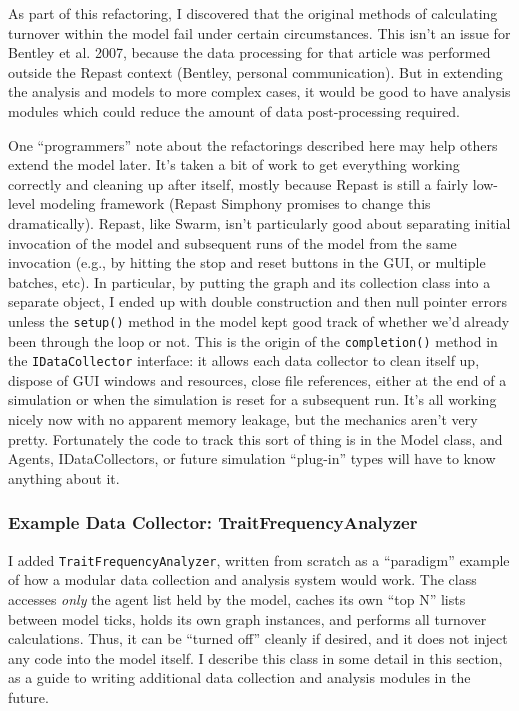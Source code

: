 \documentclass{kluwer-mem-copyright}
\begin{document}
\begin{article}
As part of this refactoring, I discovered that the original methods of
calculating turnover within the model fail under certain circumstances.  This
isn't an issue for Bentley et al. 2007, because the data processing for that
article was performed outside the Repast context (Bentley, personal
communication).  But in extending the analysis and models to more complex cases,
it would be good to have analysis modules which could reduce the amount of data
post-processing required.  

One ``programmers'' note about the refactorings described here may help others
extend the model later. It's taken a bit of work to
get everything working correctly and cleaning up after itself, mostly because
Repast is still a fairly low-level modeling framework (Repast Simphony promises
to change this dramatically). Repast, like
Swarm, isn't particularly good about separating initial invocation of the model
and subsequent runs of the model from the same invocation (e.g., by hitting the
stop and reset buttons in the GUI, or multiple batches, etc).  In particular, by
putting the graph and its collection class into a separate object, I ended up
with double construction and then null pointer errors unless the
\texttt{setup()} method in the model kept good track of whether we'd already
been through the loop or not.  This is the origin of the \texttt{completion()}
method in the \texttt{IDataCollector} interface:  it allows each data collector
to clean itself up, dispose of GUI windows and resources, close file references,
either at the end of a simulation or when the simulation is reset for a
subsequent run.  It's all working nicely now with no apparent memory leakage,
but the mechanics aren't very pretty.  Fortunately the code to track this sort of
thing is in the Model class, and Agents, IDataCollectors, or future simulation
``plug-in'' types will have to know anything about it.


\subsubsection{Example Data Collector:  TraitFrequencyAnalyzer}
I added \texttt{TraitFrequencyAnalyzer}, written from scratch as a
``paradigm'' example of how a modular data collection and analysis system would
work.  The class accesses \emph{only} the agent list held by the model, caches
its own ``top N'' lists between model ticks, holds its own graph instances, and
performs all turnover calculations.  Thus, it can be ``turned off'' cleanly if
desired, and it does not inject any code into the model itself.  I describe this
class in some detail in this section, as a guide to writing additional data
collection and analysis modules in the future.  


\end{article}
\end{document}
